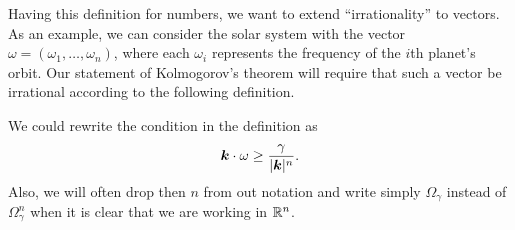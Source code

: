 \documentclass[twoside,letterpaper,10pt]{article}
\begin{document}
Having this definition for numbers, we want to extend ``irrationality'' to
vectors.
As an example, we can consider the solar system with the vector $\omega =
(\omega_1, \ldots, \omega_n)$, where each $\omega_i$ represents the frequency of
the $i$th planet's orbit.
Our statement of Kolmogorov's theorem will require that such a vector be
irrational according to the following definition.
\begin{defn}
  \label{def:diovec}
  \diovector{}
\end{defn}
We could rewrite the condition in the definition as
\begin{equation}
  \label{eq:diovec}
  \bm{k} \cdot \omega \geq \frac{\gamma}{|\bm{k}|^n}.
\end{equation}
Also, we will often drop then $n$ from out notation and write simply
$\Omega_{\gamma}$ instead of $\Omega_{\gamma}^n$ when it is clear that we are
working in $\mathbb{R}^n$.
\end{document}
